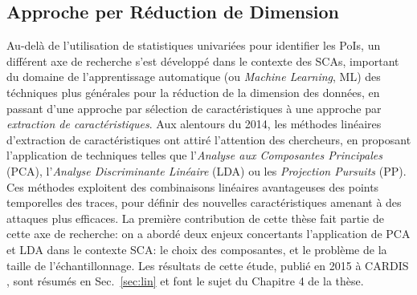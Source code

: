\subsection{Approche per R\'{e}duction de Dimension}\label{sec:dim_red_objective}
Au-del\`{a} de l'utilisation de statistiques univari\'{e}es pour identifier les PoIs, un diff\'{e}rent axe de recherche s'est d\'{e}velopp\'{e} dans le contexte des SCAs, important du domaine de l'apprentissage automatique (ou \emph{Machine Learning}, ML) des t\'{e}chniques plus g\'{e}n\'{e}rales pour la r\'{e}duction de la dimension des donn\'{e}es, en passant d'une approche par s\'{e}lection de caract\'{e}ristiques \`{a} une approche par \emph{extraction de caract\'{e}ristiques}. Aux alentours du 2014, les m\'{e}thodes lin\'{e}aires d'extraction de caract\'{e}ristiques ont attir\'{e} l'attention des chercheurs, en proposant l'application de techniques telles que l'\emph{Analyse aux Composantes Principales} (PCA), l'\emph{Analyse Discriminante Lin\'{e}aire} (LDA) ou les \emph{Projection Pursuits} (PP). Ces m\'{e}thodes exploitent des combinaisons lin\'{e}aires avantageuses des points temporelles des traces, pour d\'{e}finir des nouvelles caract\'{e}ristiques amenant \`{a} des attaques plus efficaces. La premi\`{e}re contribution de cette th\`{e}se fait partie de cette axe de recherche: on a abord\'{e} deux enjeux concertants l'application de PCA et LDA dans le contexte SCA: le choix des composantes, et le probl\`{e}me de la taille de l'\'{e}chantillonnage. Les r\'{e}sultats de cette \'{e}tude, publi\'{e} en 2015 \`{a} CARDIS \cite{Cagli2016}, sont r\'{e}sum\'{e}s en Sec.~\ref{sec:lin} et font le sujet du Chapitre 4 de la th\`ese.\\

